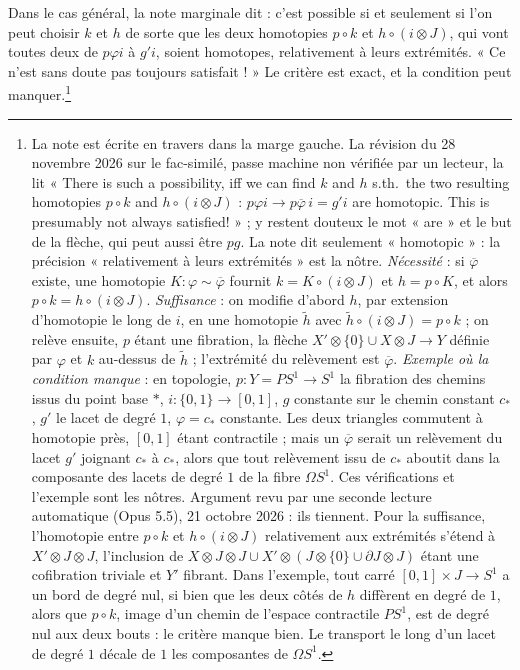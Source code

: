 \documentclass[11pt,a4paper]{article}
\begin{document}
Dans le cas général, la note marginale dit : c'est possible si et seulement
si l'on peut choisir $k$ et $h$ de sorte que les deux homotopies $p \circ k$
et $h \circ (i \otimes J)$, qui vont toutes deux de $p \varphi i$ à $g' i$,
soient homotopes, relativement à leurs extrémités. « Ce n'est sans doute
pas toujours satisfait ! » Le critère est exact, et la condition peut
manquer.\footnote{La note est écrite en travers dans la marge gauche. La
révision du 28 novembre 2026 sur le fac-similé, passe machine non vérifiée par
un lecteur, la lit « There is such a possibility, iff we can find $k$ and $h$
s.th.\ the two resulting homotopies $p \circ k$ and $h \circ (i \otimes J)$ :
$p\varphi i \to p\overline{\varphi}\,i = g' i$ are homotopic. This is
presumably not always satisfied! » ; y restent douteux le mot « are » et le
but de la flèche, qui peut aussi être $pg$. La note dit seulement
« homotopic » : la précision « relativement à leurs
extrémités » est la nôtre. \emph{Nécessité} : si $\overline{\varphi}$ existe,
une homotopie $K : \varphi \sim \overline{\varphi}$ fournit $k = K \circ (i
\otimes J)$ et $h = p \circ K$, et alors $p \circ k = h \circ (i \otimes J)$.
\emph{Suffisance} : on modifie d'abord $h$, par extension d'homotopie le long
de $i$, en une homotopie $\tilde{h}$ avec $\tilde{h} \circ (i \otimes J) = p
\circ k$ ; on relève ensuite, $p$ étant une fibration, la flèche $X' \otimes
\{0\} \cup X \otimes J \to Y$ définie par $\varphi$ et $k$ au-dessus de
$\tilde{h}$ ; l'extrémité du relèvement est $\overline{\varphi}$.
\emph{Exemple où la condition manque} : en topologie, $p : Y = P S^{1} \to
S^{1}$ la fibration des chemins issus du point base $*$, $i : \{0, 1\} \to
[0, 1]$, $g$ constante sur le chemin constant $c_{*}$, $g'$ le lacet de degré
$1$, $\varphi = c_{*}$ constante. Les deux triangles commutent à homotopie
près, $[0, 1]$ étant contractile ; mais un $\overline{\varphi}$ serait un
relèvement du lacet $g'$ joignant $c_{*}$ à $c_{*}$, alors que tout relèvement
issu de $c_{*}$ aboutit dans la composante des lacets de degré $1$ de la
fibre $\Omega S^{1}$. Ces vérifications et l'exemple sont les nôtres. Argument revu par une seconde lecture automatique (Opus 5.5), 21 octobre 2026 : ils tiennent. Pour la suffisance, l'homotopie entre $p \circ k$ et $h \circ (i \otimes J)$ relativement aux extrémités s'étend à $X' \otimes J \otimes J$, l'inclusion de $X \otimes J \otimes J \cup X' \otimes (J \otimes \{0\} \cup \partial J \otimes J)$ étant une cofibration triviale et $Y'$ fibrant. Dans l'exemple, tout carré $[0,1] \times J \to S^{1}$ a un bord de degré nul, si bien que les deux côtés de $h$ diffèrent en degré de $1$, alors que $p \circ k$, image d'un chemin de l'espace contractile $P S^{1}$, est de degré nul aux deux bouts : le critère manque bien. Le transport le long d'un lacet de degré $1$ décale de $1$ les composantes de $\Omega S^{1}$.}
\end{document}
